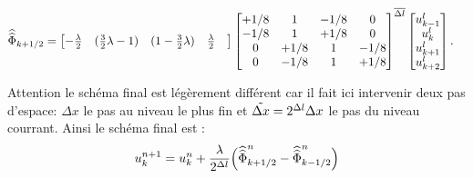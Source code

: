 \begin{align}
    \widehat{\widehat{\Phi}}_{k+1/2}
        &=
    \begin{bmatrix}
        -\frac{\lambda}{2}&
        (\frac{3}{2} \lambda - 1)&
        (1 - \frac{3}{2} \lambda)&
        \frac{\lambda}{2}&
    \end{bmatrix}
    \begin{bmatrix}
        +1/8 & 1 & -1/8 & 0\\
        -1/8 & 1 & +1/8 & 0\\
        0 & +1/8 & 1 & -1/8\\
        0 & -1/8 & 1 & +1/8\\
    \end{bmatrix}^{{\overline{\Delta l}}}
    \begin{bmatrix}
        u^l_{k-1}\\
        u^l_{k}\\
        u^l_{k+1}\\
        u^l_{k+2}\\
    \end{bmatrix}.
\end{align}

Attention le schéma final est légèrement différent car il fait ici intervenir deux pas d'espace: $\Delta x$ le pas au niveau le plus fin
et $\Tilde {\Delta x} = 2^{\Delta l} \Delta x$ le pas du niveau courrant. Ainsi le schéma final est :
\begin{align}
    {u}^{n+1}_k = {u}^n_k + \frac{\lambda}{2^{\Delta l}} \Bigl( \widehat{\widehat{\Phi}}^n_{k+1/2} - \widehat{\widehat{\Phi}}^n_{k-1/2} \Bigr)
\end{align}
